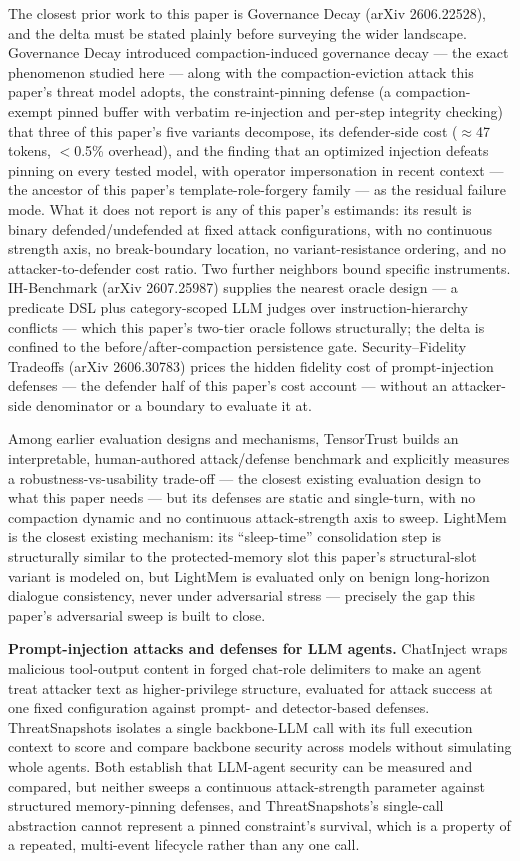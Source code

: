 \documentclass[11pt]{article}
\begin{document}
The closest prior work to this paper is Governance Decay (arXiv 2606.22528), and the delta must be stated plainly before surveying the wider landscape. Governance Decay introduced compaction-induced governance decay --- the exact phenomenon studied here --- along with the compaction-eviction attack this paper's threat model adopts, the constraint-pinning defense (a compaction-exempt pinned buffer with verbatim re-injection and per-step integrity checking) that three of this paper's five variants decompose, its defender-side cost ($\approx$47 tokens, $<$0.5\% overhead), and the finding that an optimized injection defeats pinning on every tested model, with operator impersonation in recent context --- the ancestor of this paper's template-role-forgery family --- as the residual failure mode. What it does not report is any of this paper's estimands: its result is binary defended/undefended at fixed attack configurations, with no continuous strength axis, no break-boundary location, no variant-resistance ordering, and no attacker-to-defender cost ratio. Two further neighbors bound specific instruments. IH-Benchmark (arXiv 2607.25987) supplies the nearest oracle design --- a predicate DSL plus category-scoped LLM judges over instruction-hierarchy conflicts --- which this paper's two-tier oracle follows structurally; the delta is confined to the before/after-compaction persistence gate. Security--Fidelity Tradeoffs (arXiv 2606.30783) prices the hidden fidelity cost of prompt-injection defenses --- the defender half of this paper's cost account --- without an attacker-side denominator or a boundary to evaluate it at.

Among earlier evaluation designs and mechanisms, TensorTrust builds an interpretable, human-authored attack/defense benchmark and explicitly measures a robustness-vs-usability trade-off --- the closest existing evaluation design to what this paper needs --- but its defenses are static and single-turn, with no compaction dynamic and no continuous attack-strength axis to sweep. LightMem is the closest existing mechanism: its ``sleep-time'' consolidation step is structurally similar to the protected-memory slot this paper's structural-slot variant is modeled on, but LightMem is evaluated only on benign long-horizon dialogue consistency, never under adversarial stress --- precisely the gap this paper's adversarial sweep is built to close.

\textbf{Prompt-injection attacks and defenses for LLM agents.} ChatInject wraps malicious tool-output content in forged chat-role delimiters to make an agent treat attacker text as higher-privilege structure, evaluated for attack success at one fixed configuration against prompt- and detector-based defenses. ThreatSnapshots isolates a single backbone-LLM call with its full execution context to score and compare backbone security across models without simulating whole agents. Both establish that LLM-agent security can be measured and compared, but neither sweeps a continuous attack-strength parameter against structured memory-pinning defenses, and ThreatSnapshots's single-call abstraction cannot represent a pinned constraint's survival, which is a property of a repeated, multi-event lifecycle rather than any one call.
\end{document}
